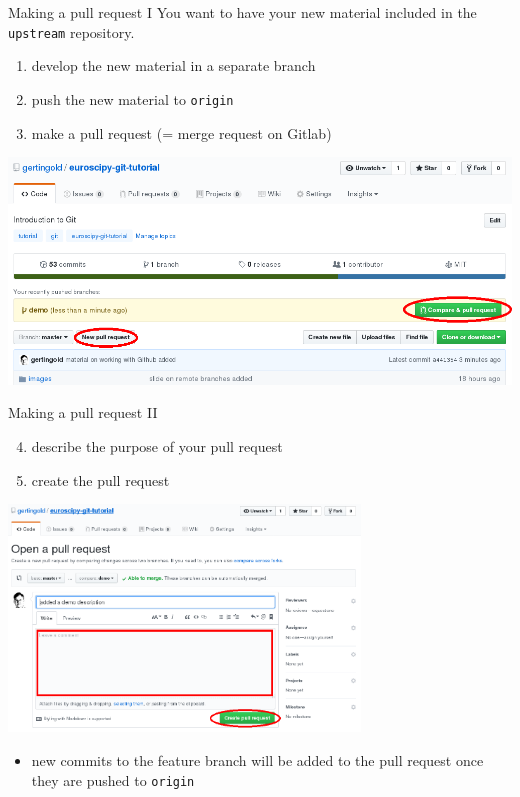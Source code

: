 \documentclass[svgnames]{beamer}
\begin{document}
\begin{frame}{Making a pull request I}
  You want to have your new material included in the
 \texttt{upstream} repository.

 \begin{enumerate}
  \item develop the new material in a separate branch
  \item push the new material to \texttt{origin}
  \item make a pull request (= merge request on Gitlab)
 \end{enumerate}

 \includegraphics[width=\textwidth]{pullrequest1}
\end{frame}

\begin{frame}{Making a pull request II}
 \begin{enumerate}
  \setcounter{enumi}{3}
  \item describe the purpose of your pull request
  \item create the pull request
 \end{enumerate}
 \begin{center}
  \includegraphics[width=0.7\textwidth]{pullrequest2}
 \end{center}

 \begin{itemize}
  \item new commits to the feature branch will be added to the pull request
      once they are pushed to \texttt{origin}
 \end{itemize}
\end{frame}
\end{document}
